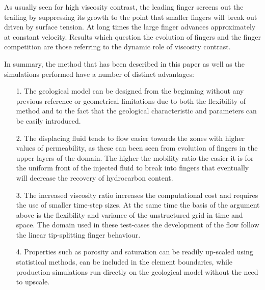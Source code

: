 \documentclass[preprint,authoryear,12pt]{elsarticle}
\begin{document}

\medskip
As usually seen for high viscosity contrast, the leading finger screens out the trailing by suppressing its growth to the point that smaller fingers will break out driven by surface tension. At long times the large finger advances approximately at
constant velocity. Results which question the evolution of fingers and the finger competition are those referring to the dynamic role of viscosity contrast.

\medskip
In summary, the method that has been described in this paper as well as the simulations performed have a number of distinct advantages: 
\begin{enumerate}
\item[1.] The geological model can be designed from the beginning without any previous reference or geometrical limitations due to both the flexibility of method and to the fact that the geological characteristic and parameters can be easily introduced.

\item[2.] The displacing fluid tends to flow easier towards the zones with higher values of permeability, as these can been seen from evolution of fingers in the upper layers of the domain. The higher the mobility ratio the easier it is for the uniform front of the injected fluid to break into fingers that eventually will decrease the recovery of hydrocarbon content.
\item[3.] The increased viscosity ratio increases the computational cost and requires the use of smaller time-step sizes. At the same time the basis of the argument above is the flexibility and variance of the unstructured grid in time and space. The domain used in these test-cases the development of the flow follow the linear tip-splitting finger behaviour.
\item[4.] Properties such as porosity and saturation can be readily up-scaled using statistical methods, can be included in the element boundaries,  while production simulations run directly on the geological model without the need to upscale.
\end{enumerate}
\end{document}
